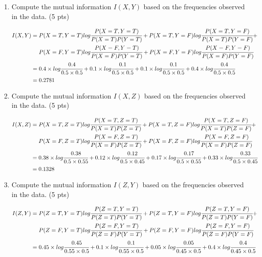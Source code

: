 \documentclass[a4paper]{article}
\theoremstyle{definition}
\newenvironment{soln}{
	\leavevmode\color{blue}\ignorespaces
}{}
\begin{document}
\begin{enumerate}
	\item Compute the mutual information $I(X, Y)$ based on the frequencies observed in the data. (5 pts)
	\begin{soln}
		\begin{align*}
			I(X, Y)&=P(X=T,Y=T)log\cfrac{P(X=T,Y=T)}{P(X=T)P(Y=T)} + P(X=T,Y=F)log\cfrac{P(X=T,Y=F)}{P(X=T)P(Y=F)} + \\
				   &\ \ \ \  P(X=F,Y=T)log\cfrac{P(X=F,Y=T)}{P(X=F)P(Y=T)} + P(X=F,Y=F)log\cfrac{P(X=F,Y=F)}{P(X=F)P(Y=F)}\\
				   &=0.4\times log\cfrac{0.4}{0.5\times 0.5} + 0.1\times log\cfrac{0.1}{0.5\times 0.5} + 0.1\times log\cfrac{0.1}{0.5\times 0.5} + 0.4\times log\cfrac{0.4}{0.5\times 0.5}\\
				   &=0.2781
		\end{align*}
	\end{soln}
	\item Compute the mutual information $I(X, Z)$ based on the frequencies observed in the data. (5 pts)
	\begin{soln}
		\begin{align*}
			I(X, Z)&=P(X=T,Z=T)log\cfrac{P(X=T,Z=T)}{P(X=T)P(Z=T)} + P(X=T,Z=F)log\cfrac{P(X=T,Z=F)}{P(X=T)P(Z=F)} + \\
				   &\ \ \ \  P(X=F,Z=T)log\cfrac{P(X=F,Z=T)}{P(X=F)P(Z=T)} + P(X=F,Z=F)log\cfrac{P(X=F,Z=F)}{P(X=F)P(Z=F)}\\
				   &=0.38\times log\cfrac{0.38}{0.5\times 0.55} + 0.12\times log\cfrac{0.12}{0.5\times 0.45} + 0.17\times log\cfrac{0.17}{0.5\times 0.55} + 0.33\times log\cfrac{0.33}{0.5\times 0.45}\\
				   &=0.1328
		\end{align*}
	\end{soln}
	\item Compute the mutual information $I(Z, Y)$ based on the frequencies observed in the data. (5 pts)
	\begin{soln}
		\begin{align*}
			I(Z, Y)&=P(Z=T,Y=T)log\cfrac{P(Z=T,Y=T)}{P(Z=T)P(Y=T)} + P(Z=T,Y=F)log\cfrac{P(Z=T,Y=F)}{P(Z=T)P(Y=F)} + \\
				   &\ \ \ \  P(Z=F,Y=T)log\cfrac{P(Z=F,Y=T)}{P(Z=F)P(Y=T)} + P(Z=F,Y=F)log\cfrac{P(Z=F,Y=F)}{P(Z=F)P(Y=F)}\\
				   &=0.45\times log\cfrac{0.45}{0.55\times 0.5} + 0.1\times log\cfrac{0.1}{0.55\times 0.5} + 0.05\times log\cfrac{0.05}{0.45\times 0.5} + 0.4\times log\cfrac{0.4}{0.45\times 0.5}\\

\end{align*}
\end{soln}
\end{enumerate}
\end{document}
